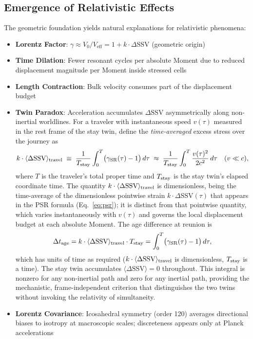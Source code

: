 \documentclass[11pt,letterpaper]{article}
\begin{document}
\subsection{Emergence of Relativistic Effects}

The geometric foundation yields natural explanations for relativistic phenomena:
\begin{itemize}
    \item \textbf{Lorentz Factor}: $\gamma \approx V_0 / V_\text{eff} = 1 + k \cdot \Delta\text{SSV}$ (geometric origin)
    \item \textbf{Time Dilation}: Fewer resonant cycles per absolute Moment due to reduced displacement magnitude per Moment inside stressed cells
    \item \textbf{Length Contraction}: Bulk velocity consumes part of the displacement budget
  \item \textbf{Twin Paradox}: Acceleration accumulates $\Delta\text{SSV}$ asymmetrically along non-inertial worldlines. For a traveler with instantaneous speed $v(\tau)$ measured in the rest frame of the stay twin, define the \emph{time-averaged} excess stress over the journey as
\[
    k \cdot \langle\Delta\text{SSV}\rangle_{\rm travel}
    \;\equiv\; \frac{1}{T_{\rm stay}} \int_0^{T} \bigl(\gamma_{\rm SR}(\tau) - 1\bigr)\, d\tau
    \;\approx\; \frac{1}{T_{\rm stay}} \int_0^{T}
    \frac{v(\tau)^2}{2c^2}\, d\tau
    \quad (v \ll c),
\]
where $T$ is the traveler's total proper time and $T_{\rm stay}$ is the stay twin's elapsed coordinate time. The quantity $k \cdot \langle\Delta\text{SSV}\rangle_{\rm travel}$ is dimensionless, being the time-average of the dimensionless pointwise strain $k \cdot \Delta\text{SSV}(\tau)$ that appears in the PSR formula (Eq.~\ref{eq:psr}); it is distinct from that pointwise quantity, which varies instantaneously with $v(\tau)$ and governs the local displacement budget at each absolute Moment. The age difference at reunion is 
\[
    \Delta t_{\rm age} 
    = k \cdot \langle\Delta\text{SSV}\rangle_{\rm travel} \cdot T_{\rm stay}
    = \int_0^{T} \bigl(\gamma_{\rm SR}(\tau) - 1\bigr)\, d\tau,
\]
which has units of time as required ($k \cdot \langle\Delta\text{SSV}\rangle_{\rm travel}$ is dimensionless, $T_{\rm stay}$ is a time). The stay twin accumulates $\langle\Delta\text{SSV}\rangle = 0$ throughout. This integral is nonzero for any non-inertial path and zero for any inertial path, providing the mechanistic, frame-independent criterion that distinguishes the two twins without invoking the relativity of simultaneity.
    \item \textbf{Lorentz Covariance}: Icosahedral symmetry (order 120) averages directional biases to isotropy at macroscopic scales; discreteness appears only at Planck accelerations
\end{itemize}
\end{document}

